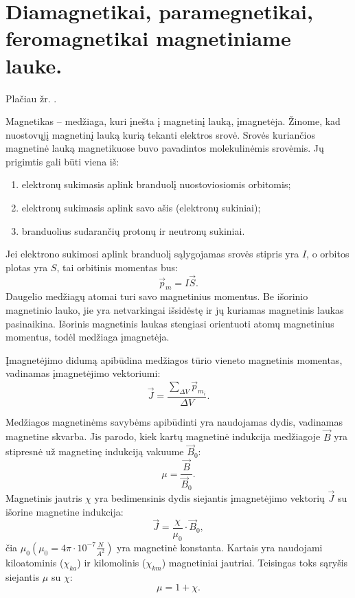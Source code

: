 \section{Diamagnetikai, paramegnetikai, feromagnetikai magnetiniame lauke.}

Plačiau žr. \cite[77p.]{elektra-magnetizmas}.

Magnetikas – medžiaga, kuri įnešta į magnetinį lauką, įmagnetėja.
Žinome, kad nuostovųjį magnetinį lauką kurią tekanti elektros
srovė. Srovės kuriančios magnetinė lauką magnetikuose buvo
pavadintos molekulinėmis srovėmis. Jų prigimtis gali būti viena iš:
\begin{enumerate}
  \item elektronų sukimasis aplink branduolį nuostoviosiomis orbitomis;
  \item elektronų sukimasis aplink savo ašis (elektronų sukiniai);
  \item branduolius sudarančių protonų ir neutronų sukiniai.
\end{enumerate}

Jei elektrono sukimosi aplink branduolį sąlygojamas srovės stipris
yra $I$, o orbitos plotas yra $S$, tai orbitinis momentas bus:
\begin{equation*}
  \vec{p}_{m} = I \vec{S}.
\end{equation*}
Daugelio medžiagų atomai turi savo magnetinius momentus. Be išorinio
magnetinio lauko, jie yra netvarkingai išsidėstę ir jų kuriamas
magnetinis laukas pasinaikina. Išorinis magnetinis laukas stengiasi
orientuoti atomų magnetinius momentus, todėl medžiaga įmagnetėja.

Įmagnetėjimo didumą apibūdina medžiagos tūrio vieneto magnetinis
momentas, vadinamas įmagnetėjimo vektoriumi:
\begin{equation*}
  \vec{J} = \frac{\sum _{\Delta V} \vec{p}_{m_{i}}}{\Delta V}.
\end{equation*}

Medžiagos magnetinėms savybėms apibūdinti yra naudojamas dydis,
vadinamas magnetine skvarba. Jis parodo, kiek kartų magnetinė
indukcija medžiagoje $\vec{B}$ yra stipresnė už magnetinę
indukciją vakuume $\vec{B}_{0}$:
\begin{equation*}
  \mu = \frac{\vec{B}}{\vec{B}_{0}}.
\end{equation*}
Magnetinis jautris $\chi$ yra bedimensinis dydis siejantis įmagnetėjimo
vektorių $\vec{J}$ su išorine magnetine indukcija:
\begin{equation*}
  \vec{J} = \frac{\chi}{\mu_{0}} \cdot \vec{B}_{0},
\end{equation*}
čia $\mu_{0} (\mu_{0} = 4\pi\cdot10^{-7}\frac{N}{A^{2}})$ yra
magnetinė konstanta. Kartais yra naudojami kiloatominis ($\chi_{ka}$)
ir kilomolinis ($\chi_{km}$) magnetiniai jautriai. Teisingas toks
sąryšis siejantis $\mu$ su $\chi$:
\begin{equation*}
  \mu = 1 + \chi.
\end{equation*}

